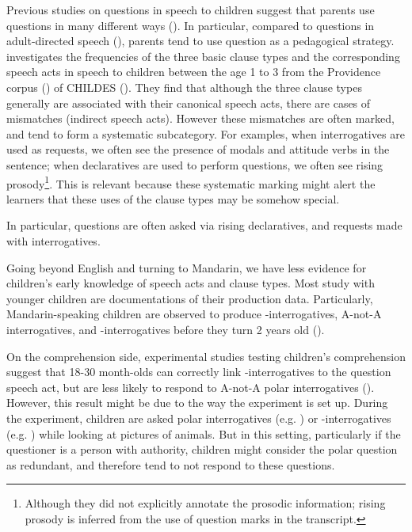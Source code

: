 Previous studies on questions in speech to children suggest that parents use questions in many different ways (\citealt{holzman1972, shatz1979, tamir1980, yu2019pedagogical}). In particular, compared to questions in adult-directed speech (\citealt{stivers2010}), parents tend to use question as a pedagogical strategy. \citealt{zaitsu2020} investigates the frequencies of the three basic clause types and the corresponding speech acts in speech to children between the age 1 to 3 from the Providence corpus (\citealt{ProvidenceCorpus}) of CHILDES (\citealt{CHILDES}). They find that although the three clause types generally are associated with their canonical speech acts, there are cases of mismatches (indirect speech acts). However these mismatches are often marked, and tend to form a systematic subcategory. For examples, when interrogatives are used as requests, we often see the presence of modals and attitude verbs in the sentence; when declaratives are used to perform questions, we often see rising prosody\footnote{Although they did not explicitly annotate the prosodic information; rising prosody is inferred from the use of question marks in the transcript.}. This is relevant because these systematic marking might alert the learners that these uses of the clause types may be somehow special. 


In particular, questions are often asked via rising declaratives, and requests made with interrogatives. 



Going beyond English and turning to Mandarin, we have less evidence for children's early knowledge of speech acts and clause types. Most study with younger children are documentations of their production data. Particularly, Mandarin-speaking children are observed to produce \ma-interrogatives, A-not-A interrogatives, and \twh-interrogatives before they turn 2 years old (\citealt{miao1986acq, miao1992, lee1989acq, litang1991int, lichen1997compprod, lichen1997comp, fan2012, lijingwong2017}). 

On the comprehension side, experimental studies testing children’s comprehension suggest that 18-30 month-olds can correctly link \twh-interrogatives to the question speech act, but are less likely to respond to A-not-A polar interrogatives (\textcite{moradlou2020}). However, this result might be due to the way the experiment is set up. During the experiment, children are asked polar interrogatives (e.g. ) or \twh-interrogatives (e.g. ) while looking at pictures of animals. But in this setting, particularly if the questioner is a person with authority, children might consider the polar question as redundant, and therefore tend to not respond to these questions. 

